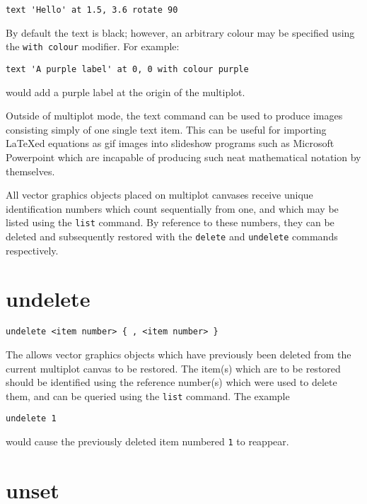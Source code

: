 \begin{verbatim}
text 'Hello' at 1.5, 3.6 rotate 90
\end{verbatim}

By default the text is black; however, an arbitrary colour may be specified
using the {\tt with colour} modifier.  For example:

\begin{verbatim}
text 'A purple label' at 0, 0 with colour purple
\end{verbatim}

\noindent would add a purple label at the origin of the multiplot.

Outside of multiplot mode, the text command can be used to produce images
consisting simply of one single text item. This can be useful for importing
\LaTeX ed equations as gif images into slideshow programs such as Microsoft
Powerpoint which are incapable of producing such neat mathematical notation
by themselves.

All vector graphics objects placed on multiplot canvases receive unique
identification numbers which count sequentially from one, and which may be
listed using the {\tt list} command.  By reference to these numbers, they can
be deleted and subsequently restored with the {\tt delete} and {\tt undelete}
commands respectively.


\section{undelete}

\begin{verbatim}
undelete <item number> { , <item number> }
\end{verbatim}

The  allows vector graphics objects which have previously
been deleted from the current multiplot canvas to be restored.  The item(s)
which are to be restored should be identified using the reference number(s)
which were used to delete them, and can be queried using the {\tt list}
command. The example

\begin{verbatim}
undelete 1
\end{verbatim}

\noindent would cause the previously deleted item numbered {\tt 1} to reappear.


\section{unset}

